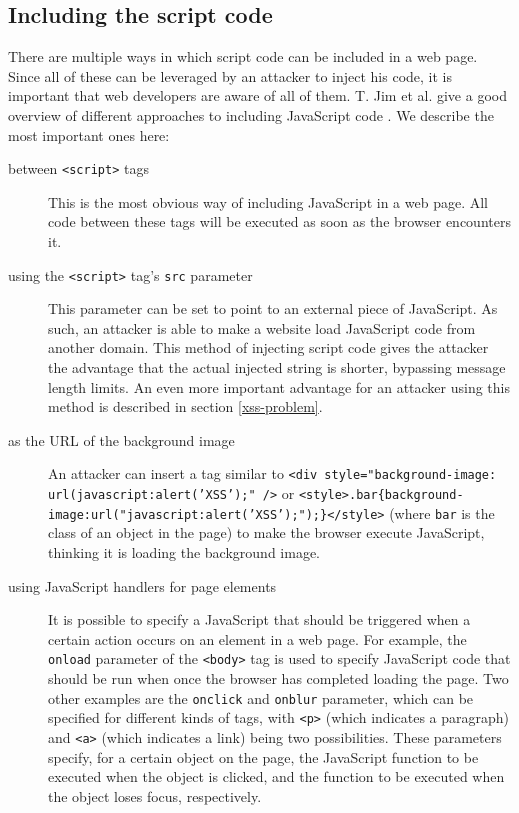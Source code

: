 \subsection{Including the script code}\label{injecting-script}
There are multiple ways in which script code can be included in a web page. Since all of these can be leveraged by an attacker to inject his code, it is important that web developers are aware of all of them. T. Jim et al. give a good overview of different approaches to including JavaScript code \cite{Jim2007}. We describe the most important ones here:
\begin{description}
	\item[between \texttt{<script>} tags] This is the most obvious way of including JavaScript in a web page. All code between these tags will be executed as soon as the browser encounters it.
	\item[using the \texttt{<script>} tag's \texttt{src} parameter] This parameter can be set to point to an external piece of JavaScript. As such, an attacker is able to make a website load JavaScript code from another domain. This method of injecting script code gives the attacker the advantage that the actual injected string is shorter, bypassing message length limits. An even more important advantage for an attacker using this method is described in section \ref{xss-problem}.
	\item[as the URL of the background image] An attacker can insert a tag similar to \texttt{<div style="background-image: url(javascript:alert('XSS');" />} or \texttt{<style>.bar\{background-image:url("javascript:alert('XSS');");\}</style>} (where \texttt{bar} is the class of an object in the page) to make the browser execute JavaScript, thinking it is loading the background image.
	\item[using JavaScript handlers for page elements] It is possible to specify a JavaScript that should be triggered when a certain action occurs on an element in a web page. For example, the \texttt{onload} parameter of the \texttt{<body>} tag is used to specify JavaScript code that should be run when once the browser has completed loading the page. Two other examples are the \texttt{onclick} and \texttt{onblur} parameter, which can be specified for different kinds of tags, with \texttt{<p>} (which indicates a paragraph) and \texttt{<a>} (which indicates a link) being two possibilities. These parameters specify, for a certain object on the page, the JavaScript function to be executed when the object is clicked, and the function to be executed when the object loses focus, respectively.
\end{description}

